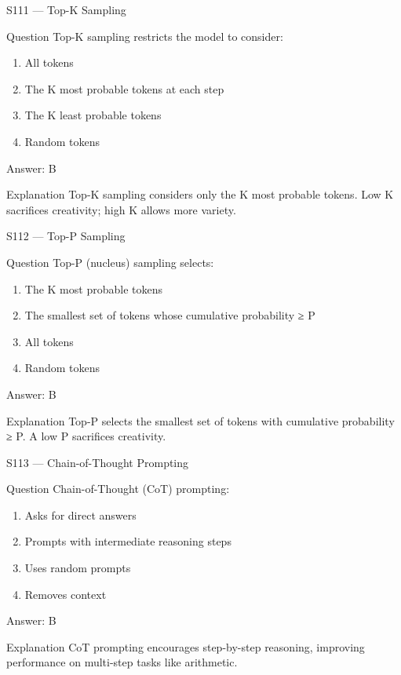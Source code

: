 \documentclass[aspectratio=169,8pt]{beamer}
\begin{document}
	\begin{frame}{S111 --- Top-K Sampling}
		\begin{block}{Question}
			Top-K sampling restricts the model to consider:
			\begin{enumerate}
				\item All tokens
				\item The K most probable tokens at each step
				\item The K least probable tokens
				\item Random tokens
			\end{enumerate}
		\end{block}
		\begin{exampleblock}{Answer: B}\end{exampleblock}
		\begin{block}{Explanation}
			Top-K sampling considers only the K most probable tokens. Low K sacrifices creativity; high K allows more variety.
		\end{block}
	\end{frame}
	
	\begin{frame}{S112 --- Top-P Sampling}
		\begin{block}{Question}
			Top-P (nucleus) sampling selects:
			\begin{enumerate}
				\item The K most probable tokens
				\item The smallest set of tokens whose cumulative probability ≥ P
				\item All tokens
				\item Random tokens
			\end{enumerate}
		\end{block}
		\begin{exampleblock}{Answer: B}\end{exampleblock}
		\begin{block}{Explanation}
			Top-P selects the smallest set of tokens with cumulative probability ≥ P. A low P sacrifices creativity.
		\end{block}
	\end{frame}
	
	\begin{frame}{S113 --- Chain-of-Thought Prompting}
		\begin{block}{Question}
			Chain-of-Thought (CoT) prompting:
			\begin{enumerate}
				\item Asks for direct answers
				\item Prompts with intermediate reasoning steps
				\item Uses random prompts
				\item Removes context
			\end{enumerate}
		\end{block}
		\begin{exampleblock}{Answer: B}\end{exampleblock}
		\begin{block}{Explanation}
			CoT prompting encourages step-by-step reasoning, improving performance on multi-step tasks like arithmetic.
		\end{block}
	\end{frame}
	
\end{document}
